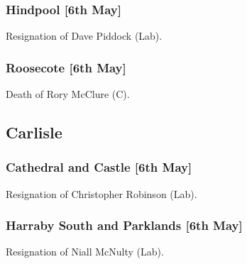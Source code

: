 \documentclass[a4paper,openany]{book}
\begin{document}
\begin{resultsiii}
\subsubsection*{Hindpool \hspace*{\fill}\nolinebreak[1]%
	\enspace\hspace*{\fill}
	[6th May]}


Resignation of Dave Piddock (Lab).

\subsubsection*{Roosecote \hspace*{\fill}\nolinebreak[1]%
	\enspace\hspace*{\fill}
	[6th May]}


Death of Rory McClure (C).

\subsection*{Carlisle}

\subsubsection*{Cathedral and Castle \hspace*{\fill}\nolinebreak[1]%
	\enspace\hspace*{\fill}
	[6th May]}


Resignation of Christopher Robinson (Lab).

\subsubsection*{Harraby South and Parklands \hspace*{\fill}\nolinebreak[1]%
	\enspace\hspace*{\fill}
	[6th May]}


Resignation of Niall McNulty (Lab).


\end{resultsiii}
\end{document}
